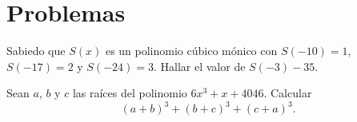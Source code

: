\section{\large Problemas}

\begin{section-problem}
    Sabiedo que $S(x)$ es un polinomio cúbico mónico con $S(-10) = 1$, $S(-17) = 2$ y $S(-24) = 3$.
    Hallar el valor de $S(-3) - 35$.
\end{section-problem}


\begin{section-problem}
    Sean $a$, $b$ y $c$ las raíces del polinomio $6x^3 + x + 4046$.
    Calcular
    \[
        (a + b)^3 + (b + c)^3 + (c + a)^3.
    \]
\end{section-problem}